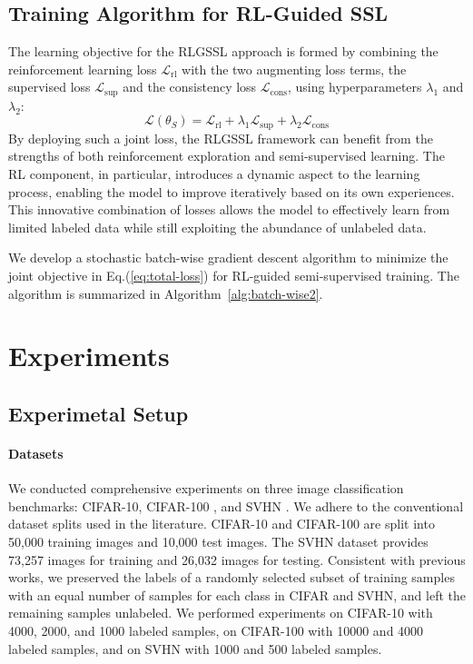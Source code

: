 \subsection{Training Algorithm for RL-Guided SSL}
\label{sec:optimization-process}

The learning objective for the RLGSSL approach is formed by combining the reinforcement learning loss
$\mathcal{L}_\text{rl}$ with the two augmenting loss terms, 
the supervised loss $\mathcal{L}_\text{sup}$ and the consistency loss $\mathcal{L}_{\text{cons}}$,
using hyperparameters $\lambda_1$ and $\lambda_2$:
\begin{equation}
\label{eq:total-loss}
\mathcal{L}(\theta_{S}) =\mathcal{L}_{\text{rl}} + \lambda_1 \mathcal{L}_{\text{sup}} +\lambda_2 \mathcal{L}_{\text{cons}}
\end{equation}
By deploying such a joint loss,
the RLGSSL framework can benefit from the strengths of 
both reinforcement exploration and semi-supervised learning. 
The RL component, in particular, introduces a dynamic aspect to the learning process, enabling the model to improve iteratively based on its own experiences. This innovative combination of losses allows the model to effectively learn from limited labeled data while still exploiting the abundance of unlabeled data.

We develop a stochastic batch-wise gradient descent algorithm to minimize the joint objective in Eq.(\ref{eq:total-loss})
for RL-guided semi-supervised training. 
The algorithm is summarized in Algorithm~\ref{alg:batch-wise2}.

\section{Experiments}
\subsection{Experimetal Setup}

\paragraph{Datasets}
We conducted comprehensive experiments on three 
image classification benchmarks: CIFAR-10, CIFAR-100 \cite{krizhevsky2009learning}, and SVHN \cite{netzer2011reading}. 
We adhere to the conventional dataset splits used in the literature.
CIFAR-10 and CIFAR-100 are split into 50,000 training images and 10,000 test images.
The SVHN dataset
provides 73,257 images for training and 26,032 images for testing.
Consistent with previous works, we preserved the labels of a randomly selected subset of training samples with an equal number of samples for each class in CIFAR and SVHN, and left the remaining samples unlabeled. 
We performed experiments on CIFAR-10 with 4000, 2000, and 1000 labeled samples, on CIFAR-100 with 10000 and 4000 labeled samples, and on SVHN with 1000 and 500 labeled samples.


